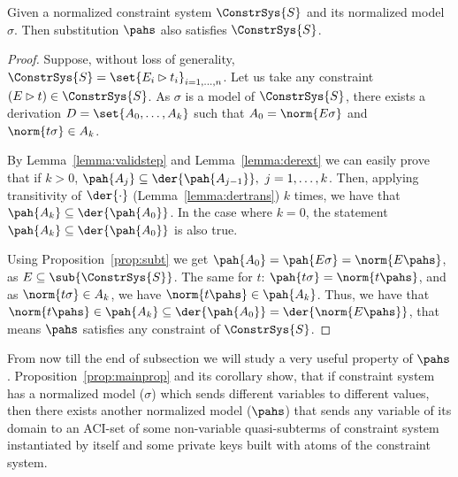 \begin{theorem}\label{theorem:solution}
Given a normalized constraint system $\ConstrSys{S}$ and its normalized model $\sigma$.
Then substitution $\pahs$ also satisfies $\ConstrSys{S}$.
 \begin{proof}
 Suppose, without loss of generality, $\ConstrSys{S}= \set{E_i \rhd t_i}_{i=1, \dots, n}$.
  Let us take any constraint $(E \rhd t) \in \ConstrSys{S}$. As $\sigma$ is a model of $\ConstrSys{S}$,  there exists a derivation $D=\set{A_0, \dots, A_{k}}$  such that $A_0=\norm{E\sigma}$ and $\norm{t\sigma} \in A_{k}$. 

By Lemma~\ref{lemma:validstep} and Lemma~\ref{lemma:derext} we can easily prove that if $k>0$, $\pah{A_{j}} \subseteq \der{\pah{A_{j-1}}}, \  j=1,\dots,k$. 
Then, applying transitivity of $\der{\cdot}$ (Lemma~\ref{lemma:dertrans}) $k$ times, we have that $\pah{A_k} \subseteq \der{\pah{A_0}}$. In the case where $k=0$, the statement $\pah{A_k} \subseteq \der{\pah{A_0}}$ is also true.


 Using Proposition~\ref{prop:subt} we get $\pah{A_0} =\pah{E\sigma} = \norm{E\pahs}$, as $E \subseteq \sub{\ConstrSys{S}}$. The same for $t$: $\pah{t\sigma} = \norm{t\pahs}$, and as $\norm{t\sigma} \in A_k$, we have $\norm{t\pahs} \in \pah{A_k}$. 
Thus, we have that $\norm{t\pahs} \in \pah{A_k} \subseteq \der{\pah{A_0}} = \der{\norm{E\pahs}} $, that means $\pahs$ satisfies any constraint of $\ConstrSys{S}$. 

 \end{proof}
\end{theorem}

From now till the end of subsection we will study a very useful property of $\pahs$.
Proposition~\ref{prop:mainprop} and its corollary show, 
that if constraint system has a normalized model ($\sigma$) which sends different variables to different values, 
then there exists another normalized model ($\pahs$)  that  sends any variable of its domain
to an ACI-set of some non-variable quasi-subterms of constraint system instantiated by itself
and some private keys built with atoms of  the constraint system.

